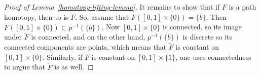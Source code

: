\begin{proof}[Proof of Lemma~\ref{homotopy-lifting-lemma}]
  It remains to show that if $F$ is a path homotopy, then so is $\tilde{F}$. So, assume that $F([0,1] \times \{0\}) = \{b\}$. Then $\tilde{F}([0,1]\times\{0\}) \subset p^{-1}(\{b\})$. Now $[0,1] \times \{0\}$ is connected, so its image under $\tilde{F}$ is connected, and on the other hand, $p^{-1}(\{b\})$ is discrete so its connected components are points, which means that $\tilde{F}$ is constant on $[0,1] \times \{0\}$. Similarly, if $F$ is constant on $[0,1] \times \{1\}$, one uses connectedness to argue that $\tilde{F}$ is as well.
\end{proof}
